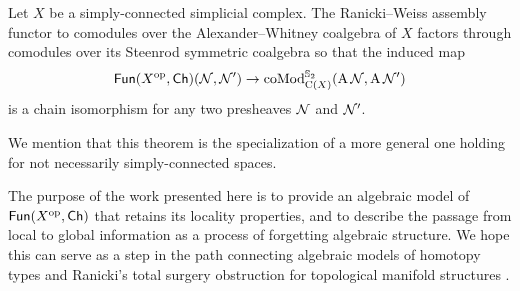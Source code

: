 \begin{theorem*}
	Let $X$ be a simply-connected simplicial complex.
	The Ranicki--Weiss assembly functor to comodules over the Alexander--Whitney coalgebra of $X$ factors through comodules over its Steenrod symmetric coalgebra so that the induced map
	\[
	\mathsf{Fun}(X^{\mathrm{op}}, \mathsf{Ch})(\mathcal{N}, \mathcal{N}') \to \operatorname{coMod}^{\mathbb{S}_2}_{\operatorname{C}(X)}(\operatorname{A}\mathcal{N}, \operatorname{A}\mathcal{N}')
	\]
	is a chain isomorphism for any two presheaves $\mathcal{N}$ and $\mathcal{N}'$.
\end{theorem*}

We mention that this theorem is the specialization of a more general one holding for not necessarily simply-connected spaces.

The purpose of the work presented here is to provide an algebraic model of $\mathsf{Fun}(X^{\mathrm{op}},\mathsf{Ch})$ that retains its locality properties, and to describe the passage from local to global information as a process of forgetting algebraic structure.
We hope this can serve as a step in the path connecting algebraic models of homotopy types \cite{quillen1969rational, sullivan1977infinitesimal,mandell2001padic} and Ranicki's total surgery obstruction for topological manifold structures \cite{ranicki1979obstruction,ranicki1992topological,macko2013obstruction}.